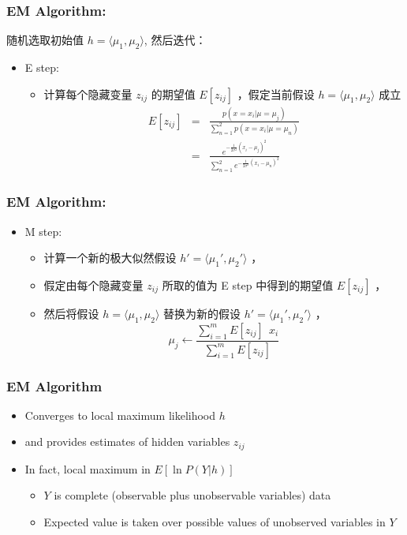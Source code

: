 \documentclass{beamer}
\begin{document}
\begin{frame}
\frametitle{EM Algorithm:}
\label{sec-11-4}

随机选取初始值 $h = \langle \mu_1, \mu_2 \rangle$, 然后迭代：
\begin{itemize}
\item E step:
\begin{itemize}
\item 计算每个隐藏变量 $z_{ij}$ 的期望值 $E[z_{ij}]$ ，假定当前假设 $h = \langle \mu_1, \mu_2 \rangle$ 成立
     \begin{eqnarray}
      E[z_{ij}] & = & \frac{p(x=x_i | \mu = \mu_j)}{\sum_{n=1}^{2} p(x = x_i | \mu=\mu_n)} \nonumber \\
      & = & \frac{e^{-\frac{1}{2 \sigma^2} (x_i -  \mu_j)^2}}{\sum_{n=1}^{2} e^{-\frac{1}{2 \sigma^2} (x_i - \mu_n)^2}} \nonumber
     \end{eqnarray}
\end{itemize}
\end{itemize}
\end{frame}
\begin{frame}
\frametitle{EM Algorithm:}
\label{sec-11-5}

\begin{itemize}
\item M step:
\begin{itemize}
\item 计算一个新的极大似然假设 $h' = \langle \mu_1', \mu_2' \rangle$ ，
\item 假定由每个隐藏变量 $z_{ij}$ 所取的值为 E step 中得到的期望值 $E[z_{ij}]$ ，
\item 然后将假设 $h =\langle \mu_1, \mu_2 \rangle$ 替换为新的假设 $h' = \langle \mu_1', \mu_2' \rangle$ ，
      $$\mu_j \leftarrow \frac{\sum_{i=1}^m E[z_{ij}] \ \  x_i}{\sum_{i=1}^m E[z_{ij}]}$$
\end{itemize}
\end{itemize}
\end{frame}
\begin{frame}
\frametitle{EM Algorithm}
\label{sec-11-6}


\begin{itemize}
\item Converges to local maximum likelihood $h$
\item and provides estimates of hidden variables $z_{ij}$
\item In fact, local maximum in $E[\ln P(Y|h)]$
\begin{itemize}
\item $Y$ is complete (observable plus unobservable variables) data
\item Expected value is taken over possible values of unobserved variables in $Y$
\end{itemize}
\end{itemize}
\end{frame}
\end{document}
